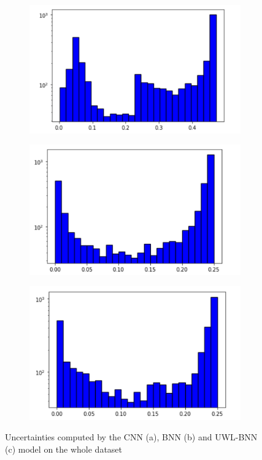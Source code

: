 \documentclass[11pt,twoside,a4paper]{article}
\begin{document}
\begin{figure}[!t]
    \centering
    \begin{subfigure}{0.30\textwidth}
	\includegraphics[width=\linewidth]{histo_CNN_all_real+fake.png}
        \caption{}
    \end{subfigure}
    \begin{subfigure}{0.30\textwidth}
	\includegraphics[width=\linewidth]{histo_BNN_all_real+fake.png}
        \caption{}
    \end{subfigure}
	\begin{subfigure}{0.30\textwidth}
	\includegraphics[width=\linewidth]{histo_Custom_all_real+fake.png}
        \caption{}
    \end{subfigure}
    \caption{Uncertainties computed by the CNN (a), BNN (b) and UWL-BNN (c) model on the whole dataset}
    \label{fig:histograms}
\end{figure}
\end{document}
